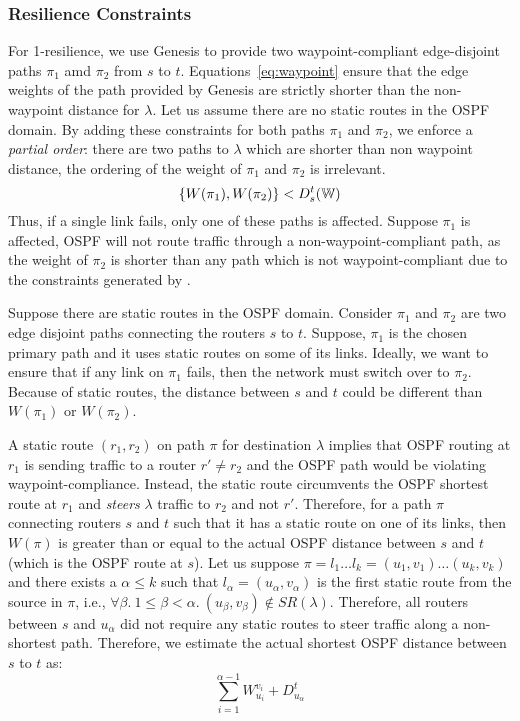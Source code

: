 \subsubsection{Resilience Constraints} \label{sec:ospfresilience}
For 1-resilience, we use Genesis to provide two waypoint-compliant 
edge-disjoint paths $\pi_1$ amd $\pi_2$ from $s$ to $t$.
Equations~\ref{eq:waypoint} ensure that the edge weights 
of the path provided by Genesis are strictly shorter than 
the non-waypoint distance for $\lambda$. 
Let us assume there are no static routes in the 
OSPF domain. By adding these
constraints for both paths $\pi_1$ and $\pi_2$, 
we enforce a \emph{partial order}: there are two paths to $\lambda$
which are shorter than non waypoint distance, the 
ordering of the weight of $\pi_1$ and $\pi_2$ is irrelevant. 
\begin{equation} \label{eq:resilience}
\{ W(\pi_1), W(\pi_2) \} < D^t_s(\mathbb{W}) 
\end{equation}
Thus, if a single link fails, only one 
of these paths is affected. Suppose
$\pi_1$ is affected, OSPF will not route traffic through a  
non-waypoint-compliant path, as the weight of $\pi_2$ is shorter than any path which is not waypoint-compliant due to the constraints generated 
by \name.

Suppose there are static routes in the OSPF domain. 
Consider $\pi_1$ and $\pi_2$ are two edge disjoint paths 
connecting the routers $s$ to $t$. Suppose, $\pi_1$ is the 
chosen primary path and it uses static routes on 
some of its links.
Ideally, we want to ensure 
that if any link on $\pi_1$ fails, 
then the network must switch over to $\pi_2$. 
Because of static routes,  
the distance between $s$ and 
$t$ could be different than $W(\pi_1)$ or $W(\pi_2)$.

A static route $(r_1, r_2)$ on path $\pi$ for destination $\lambda$ implies that OSPF routing at $r_1$ is sending traffic to a 
router $r' \not= r_2$ and the OSPF path would be violating
waypoint-compliance. Instead, the static route circumvents 
the OSPF shortest route at $r_1$ and \emph{steers} $\lambda$ 
traffic to $r_2$ and not $r'$. Therefore, for a 
path $\pi$ connecting routers $s$ and $t$ such that it 
has a static route on one of its links, 
then $W(\pi)$ is greater than or equal to the 
actual OSPF distance
between $s$ and $t$ (which is the OSPF route at $s$).
Let us suppose $\pi = l_1 \ldots l_k = (u_1, v_1) \ldots (u_k, v_k)$ 
and 
there exists a $\alpha \leq k$ such that 
$l_\alpha = (u_\alpha, v_\alpha)$  
is the first 
static route from the source in $\pi$, i.e., 
$\forall \beta. ~1 \leq \beta < \alpha. ~(u_\beta, v_\beta) \not\in SR(\lambda)$.
Therefore, all routers between $s$ and $u_\alpha$ did
not require any static routes to steer traffic along a 
non-shortest path. Therefore, we estimate the 
actual shortest OSPF distance between $s$ to $t$ as:
\[
\sum_{i=1}^{\alpha - 1} W_{u_i}^{v_i} + D_{u_\alpha}^t
\]

